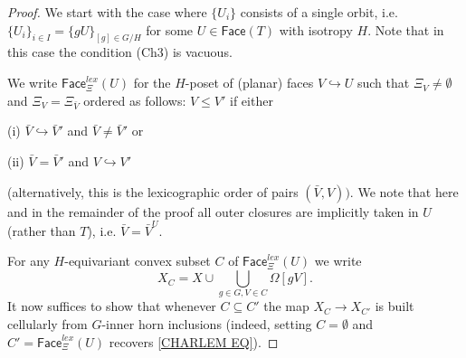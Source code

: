 \documentclass[a4paper,10pt,draft]{article}%
\numberwithin{equation}{section}%
\numberwithin{figure}{section}
\begin{document}
\begin{proof}
We start with the case where $\{U_i\}$ consists of a single orbit,
i.e. $\{U_i\}_{i \in I} = \{g U\}_{[g]\in G/H}$
for some $U \in \mathsf{Face}(T)$ with isotropy $H$.
Note that in this case the condition (Ch3) is vacuous.

We write $\mathsf{Face}_{\Xi}^{lex}(U)$
for the $H$-poset of (planar) faces $V \hookrightarrow U$
such that $\Xi_V \neq \emptyset$ and $\Xi_V = \Xi_{\bar{V}}$
ordered as follows: 
$V \leq V'$ if either 
	\begin{inparaenum}
		\item[(i)] $\bar{V} \hookrightarrow \bar{V}'$ and 
		$\bar{V} \neq \bar{V}'$ or
		\item[(ii)] $\bar{V} = \bar{V}'$ and
		$V \hookrightarrow V'$
	\end{inparaenum}
(alternatively, this is the lexicographic order of pairs $(\bar{V},V))$.
We note that here and in the remainder of the proof all outer closures are implicitly taken in $U$ (rather than $T$), i.e. 
$\bar{V}=\bar{V}^U$.

For any $H$-equivariant convex subset $C$ of $\mathsf{Face}_{\Xi}^{lex}(U)$ we write
\[
X_C = 
X \cup \bigcup_{g\in G,V \in C} \Omega[gV].
\]
It now suffices to show that whenever
$C \subseteq C'$
the map 
$X_C \to X_{C'}$ is built cellularly from 
$G$-inner horn inclusions
(indeed, setting $C=\emptyset$ and 
$C'=\mathsf{Face}_{\Xi}^{lex}(U)$ recovers \eqref{CHARLEM EQ}).


\end{proof}
\end{document}
